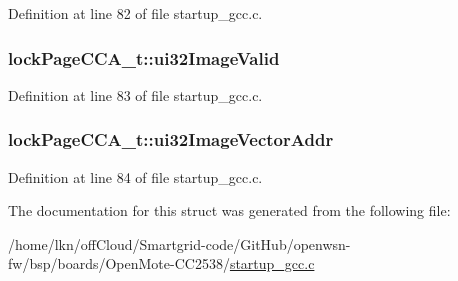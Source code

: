 Definition at line 82 of file startup\+\_\+gcc.\+c.

\subsubsection[{\texorpdfstring{ui32\+Image\+Valid}{ui32ImageValid}}]{ lock\+Page\+C\+C\+A\+\_\+t\+::ui32\+Image\+Valid}\hypertarget{structlock_page_c_c_a__t_a0573834c9ceef140f803ec4add9e0755}{}\label{structlock_page_c_c_a__t_a0573834c9ceef140f803ec4add9e0755}


Definition at line 83 of file startup\+\_\+gcc.\+c.

\subsubsection[{\texorpdfstring{ui32\+Image\+Vector\+Addr}{ui32ImageVectorAddr}}]{ lock\+Page\+C\+C\+A\+\_\+t\+::ui32\+Image\+Vector\+Addr}\hypertarget{structlock_page_c_c_a__t_a3be3ba56d40ebd68ce33292d650097c8}{}\label{structlock_page_c_c_a__t_a3be3ba56d40ebd68ce33292d650097c8}


Definition at line 84 of file startup\+\_\+gcc.\+c.



The documentation for this struct was generated from the following file\+:\begin{DoxyCompactItemize}
\item 
/home/lkn/off\+Cloud/\+Smartgrid-\/code/\+Git\+Hub/openwsn-\/fw/bsp/boards/\+Open\+Mote-\/\+C\+C2538/\hyperlink{startup__gcc_8c}{startup\+\_\+gcc.\+c}\end{DoxyCompactItemize}
